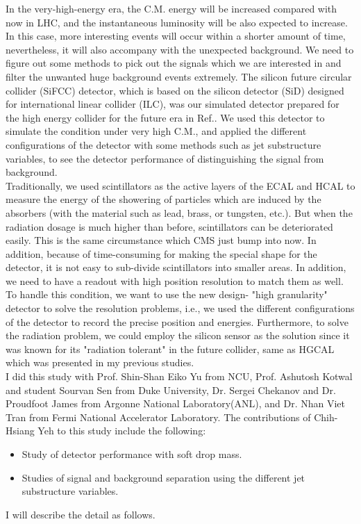 \documentclass[12pt,twoside,a4paper,an,final]{cms-tdr}
\begin{document}
In the very-high-energy era, the C.M. energy will be increased compared with now in LHC, and the instantaneous luminosity will be also expected to increase. In this case, more interesting events will occur within a shorter amount of time, nevertheless, it will also accompany with the unexpected background. We need to figure out some methods to pick out the signals which we are interested in and filter the unwanted huge background events extremely. The silicon future circular collider (SiFCC) detector, which is based on the silicon detector (SiD)\cite{Aihara:2009ad} designed for international linear collider (ILC)\cite{Adolphsen:2013kya}\cite{Behnke:2013lya}, was our simulated detector prepared for the high energy collider for the future era in Ref.\cite{Chekanov:2016ppq}. We used this detector to simulate the condition under very high C.M., and applied the different configurations of the detector with some methods such as jet substructure variables, to see the detector performance of distinguishing the signal from background.\\

Traditionally, we used scintillators as the active layers of the ECAL and HCAL to measure the energy of the showering of particles which are induced by the absorbers (with the material such as lead, brass, or tungsten, etc.). But when the radiation dosage is much higher than before, scintillators can be deteriorated easily. This is the same circumstance which CMS just bump into now. In addition, because of time-consuming for making the special shape for the detector, it is not easy to sub-divide scintillators into smaller areas. In addition, we need to have a readout with high position resolution to match them as well. To handle this condition, we want to use the new design- "high granularity" detector to solve the resolution problems, i.e., we used the different configurations of the detector to record the precise position and energies. Furthermore, to solve the radiation problem, we could employ the silicon sensor as the solution since it was known for its "radiation tolerant"\cite{Li:2002ru} in the future collider, same as HGCAL which was presented in my previous studies.\\

I did this study with Prof. Shin-Shan Eiko Yu from NCU, Prof. Ashutosh Kotwal and student Sourvan Sen from Duke University, Dr. Sergei Chekanov and Dr. Proudfoot James from Argonne National Laboratory(ANL), and Dr. Nhan Viet Tran from Fermi National Accelerator Laboratory. The contributions of Chih-Hsiang Yeh to this study include the following:
\begin{itemize}
\item Study of detector performance with soft drop mass.
\item Studies of signal and background separation using the different jet substructure variables.
\end{itemize}
I will describe the detail as follows.
\end{document}
